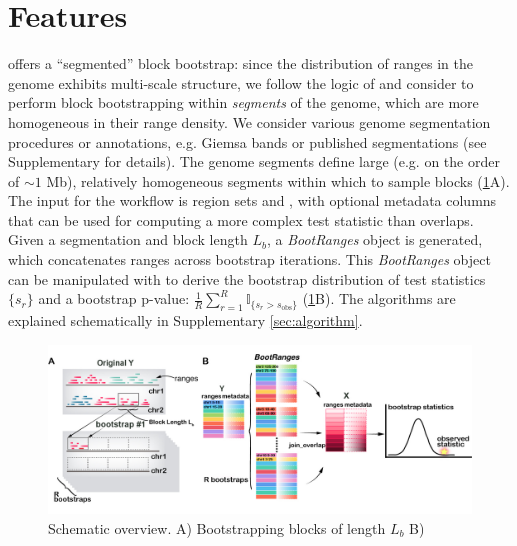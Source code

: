 \vspace*{-20pt}

\section{Features}

\bootranges offers a ``segmented'' block bootstrap:
since the distribution of ranges in the genome exhibits multi-scale
structure, we follow the logic of \citet{bickel2010subsampling} and consider to
perform block bootstrapping within \textit{segments} of the genome, which are
more homogeneous in their range density.
We consider various genome segmentation procedures
or annotations, e.g. Giemsa bands or published segmentations
(see Supplementary for details).
The genome segments define large (e.g. on the order of ${\sim}1$ Mb),
relatively homogeneous segments within which to sample blocks
(\cref{fig:framework}A). 
The input for the workflow is region sets  and
, with optional metadata columns that can be
used for computing a more complex test statistic than overlaps.
Given a segmentation and block length $L_b$, a \textit{BootRanges}
object is generated, which concatenates ranges across bootstrap
iterations. This \textit{BootRanges} object can be manipulated with \plyranges
to derive the bootstrap distribution of test statistics $\{s_r\}$ and a
bootstrap p-value:
$ \frac{1}{R} \sum_{r=1}^R \mathbb{I}_{\{s_r > s_\text{obs}\}} $ (\cref{fig:framework}B).
The \bootranges algorithms are explained schematically in Supplementary \cref{sec:algorithm}.

\begin{figure}[t]
\centering%
\setlength{\abovecaptionskip}{-0.05cm}
\includegraphics[scale=0.16]{Figures/bootRanges.jpg}
\caption{Schematic overview.
  A) Bootstrapping blocks of length $L_b$  
  B) } 
\label{fig:framework}
\vspace{-0.5cm}
\end{figure}

